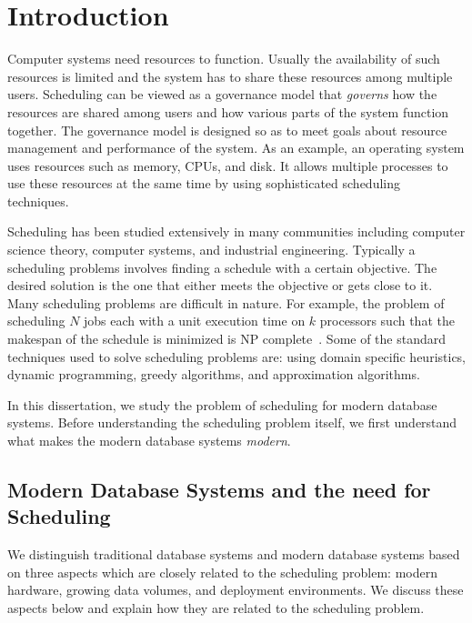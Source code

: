 \chapter{Introduction}
Computer systems need resources to function. 
Usually the availability of such resources is limited and the system has to share these resources among multiple users. 
Scheduling can be viewed as a governance model that \textit{governs} how the resources are shared among users and how various parts of the system function together. 
The governance model is designed so as to meet goals about resource management and performance of the system. 
As an example, an operating system uses resources such as memory, CPUs, and disk.
It allows multiple processes to use these resources at the same time by using sophisticated scheduling techniques. 

Scheduling has been studied extensively in many communities including computer science theory, computer systems, and industrial engineering. 
Typically a scheduling problems involves finding a schedule with a certain objective.
The desired solution is the one that either meets the objective or gets close to it.
Many scheduling problems are difficult in nature.
For example, the problem of scheduling $N$ jobs each with a unit execution time on $k$ processors such that the makespan of the schedule is minimized is NP complete~\cite{ULLMAN1975384}.
Some of the standard techniques used to solve scheduling problems are: using domain specific heuristics, dynamic programming, greedy algorithms, and approximation algorithms. 

In this dissertation, we study the problem of scheduling for modern database systems.
Before understanding the scheduling problem itself, we first understand what makes the modern database systems \textit{modern}.

\section{Modern Database Systems and the need for Scheduling}
We distinguish traditional database systems and modern database systems based on three aspects which are closely related to the scheduling problem: modern hardware, growing data volumes, and deployment environments.
We discuss these aspects below and explain how they are related to the scheduling problem. 
